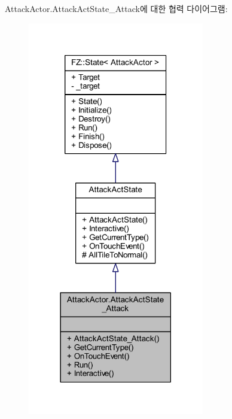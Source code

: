 Attack\+Actor.\+Attack\+Act\+State\+\_\+\+Attack에 대한 협력 다이어그램\+:
\nopagebreak
\begin{figure}[H]
\begin{center}
\leavevmode
\includegraphics[width=218pt]{class_attack_actor_1_1_attack_act_state___attack__coll__graph}
\end{center}
\end{figure}
